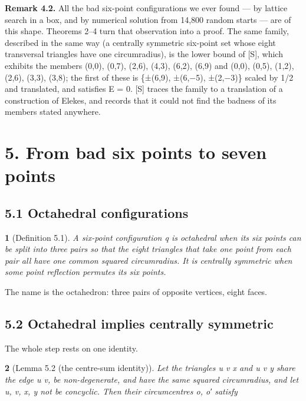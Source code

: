 \documentclass[11pt,a4paper]{article}
\theoremstyle{named}
\newtheorem*{namedthm}{}
\newcommand{\dispf}[1]{\par\smallskip{\centering #1\par}\smallskip}
\begin{document}
\textbf{Remark 4.2.} All the bad six-point configurations we ever found — by lattice search in a box, and by numerical solution from 14,800 random starts — are of this shape. Theorems 2–4 turn that observation into a proof. The same family, described in the same way (a centrally symmetric six-point set whose eight transversal triangles have one circumradius), is the lower bound of [S], which exhibits the members (0,0), (0,7), (2,6), (4,3), (6,2), (6,9) and (0,0), (0,5), (1,2), (2,6), (3,3), (3,8); the first of these is \{±(6,9), ±(6,−5), ±(2,−3)\} scaled by 1/2 and translated, and satisfies E = 0. [S] traces the family to a translation of a construction of Elekes, and records that it could not find the badness of its members stated anywhere.

\section*{5. From bad six points to seven points}

\subsection*{5.1 Octahedral configurations}

\begin{namedthm}[Definition 5.1]
A six-point configuration q is \textit{octahedral} when its six points can be split into three pairs so that the eight triangles that take one point from each pair all have one common squared circumradius. It is \textit{centrally symmetric} when some point reflection permutes its six points.
\end{namedthm}

The name is the octahedron: three pairs of opposite vertices, eight faces.

\subsection*{5.2 Octahedral implies centrally symmetric}

The whole step rests on one identity.

\begin{namedthm}[Lemma 5.2 (the centre-sum identity)]
Let the triangles u v x and u v y share the edge u v, be non-degenerate, and have the same squared circumradius, and let u, v, x, y not be concyclic. Then their circumcentres o, o′ satisfy
\dispf{o + o′ = u + v.}
\end{namedthm}
\end{document}
